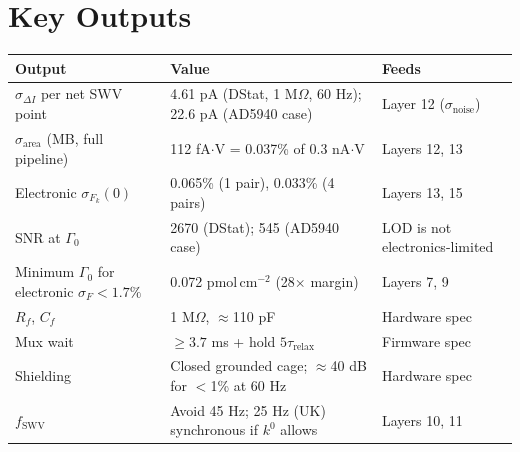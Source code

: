 \documentclass[10pt]{article}
\numberwithin{equation}{section}
\begin{document}
\section{Key Outputs}
\begin{center}\small
\begin{tabular}{@{}p{5.3cm}p{5.6cm}p{3.6cm}@{}}
\toprule
Output & Value & Feeds \\
\midrule
$\sigma_{\Delta I}$ per net SWV point & 4.61 pA (DStat, 1 M$\Omega$, 60 Hz); 22.6 pA (AD5940 case) & Layer 12 ($\sigma_{\text{noise}}$) \\
$\sigma_{\text{area}}$ (MB, full pipeline) & 112 fA$\cdot$V = 0.037\% of 0.3 nA$\cdot$V & Layers 12, 13 \\
Electronic $\sigma_{F_k}(0)$ & 0.065\% (1 pair), 0.033\% (4 pairs) & Layers 13, 15 \\
SNR at $\Gamma_0$ & 2670 (DStat); 545 (AD5940 case) & LOD is not electronics-limited \\
Minimum $\Gamma_0$ for electronic $\sigma_F < 1.7\%$ & 0.072 pmol\,cm$^{-2}$ (28$\times$ margin) & Layers 7, 9 \\
$R_f$, $C_f$ & 1 M$\Omega$, $\approx$110 pF & Hardware spec \\
Mux wait & $\ge 3.7$ ms + hold $5\tau_{\text{relax}}$ & Firmware spec \\
Shielding & Closed grounded cage; $\approx$40 dB for $<$1\% at 60 Hz & Hardware spec \\
$f_{\text{SWV}}$ & Avoid 45 Hz; 25 Hz (UK) synchronous if $k^0$ allows & Layers 10, 11 \\
\bottomrule
\end{tabular}
\end{center}

\end{document}

